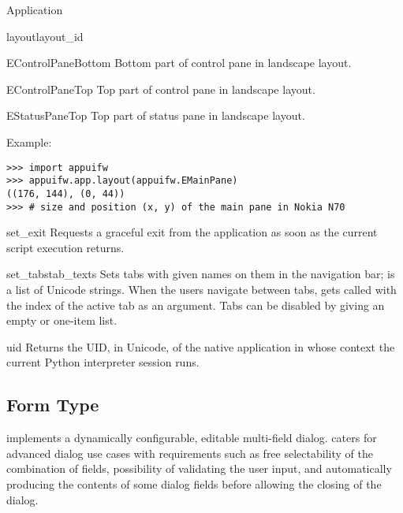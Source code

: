 \begin{classdesc*}{Application}
\begin{methoddesc}[Application]{layout}{layout_id}
\begin{datadesc}{EControlPaneBottom} 
Bottom part of control pane in landscape layout.  
\end{datadesc}

\begin{datadesc}{EControlPaneTop} 
Top part of control pane in landscape layout.  
\end{datadesc}

\begin{datadesc}{EStatusPaneTop} 
Top part of status pane in landscape layout.
\end{datadesc}

Example:
\begin{verbatim}
>>> import appuifw
>>> appuifw.app.layout(appuifw.EMainPane)
((176, 144), (0, 44))
>>> # size and position (x, y) of the main pane in Nokia N70
\end{verbatim}

\end{methoddesc}

\begin{methoddesc}[Application]{set_exit}{}
Requests a graceful exit from the application as soon as the current script 
execution returns.
\end{methoddesc}

\begin{methoddesc}[Application]{set_tabs}{tab_texts}
Sets tabs with given names on them in the navigation bar; 
 is a list of Unicode strings. When the users 
navigate between tabs,  gets called with the index 
of the active tab as an argument. Tabs can be disabled by giving an empty or 
one-item  list.
\end{methoddesc}

\begin{methoddesc}[Application]{uid}{}
Returns the UID, in Unicode, of the native application in whose 
context the current Python interpreter session runs.
\end{methoddesc}

\end{classdesc*}

\subsection{Form Type}
\label{subsec:form}
 implements a dynamically configurable, editable multi-field 
dialog.  caters for advanced dialog use cases with requirements 
such as free selectability of the combination of fields, possibility of 
validating the user input, and automatically producing the contents of some 
dialog fields before allowing the closing of the dialog. 

